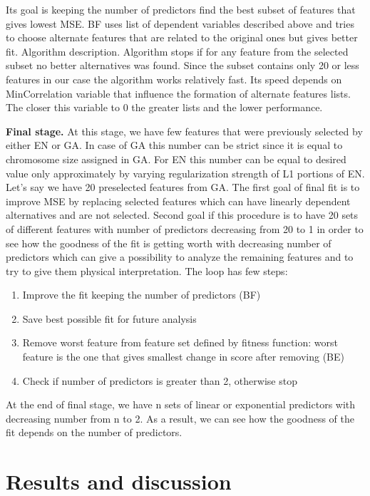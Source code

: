 \documentclass[aps,prl,reprint,amsmath,amssymb,nature]{revtex4-1}
\begin{document}
Its goal is keeping the number of predictors find the best subset of 
features that gives lowest MSE. BF uses list of dependent variables 
described above and tries to choose alternate features that are related 
to the original ones but gives better fit. Algorithm description. 
Algorithm stops if for any feature from the selected subset no better 
alternatives was found. Since the subset contains only 20 or less 
features in our case the algorithm works relatively fast. Its speed 
depends on MinCorrelation variable that influence the formation of 
alternate features lists. The closer this variable to 0 the greater 
lists and the lower performance. 

\textbf{Final stage. }At this stage, we have few features that were 
previously selected by either EN or GA. In case of GA this number can be 
strict since it is equal to chromosome size assigned in GA. For EN this 
number can be equal to desired value only approximately by varying 
regularization strength of L1 portions of EN. Let's say we have 20 
preselected features from GA. The first goal of final fit is to improve 
MSE by replacing selected features which can have linearly dependent 
alternatives and are not selected. Second goal if this procedure is to 
have 20 sets of different features with number of predictors decreasing 
from 20 to 1 in order to see how the goodness of the fit is getting 
worth with decreasing number of predictors which can give a possibility 
to analyze the remaining features and to try to give them physical 
interpretation. The loop has few steps:

\begin{enumerate}
\item Improve the fit keeping the number of predictors (BF)
\item Save best possible fit for future analysis
\item Remove worst feature from feature set defined by fitness function: 
worst feature is the one that gives smallest change in score after 
removing (BE)
\item Check if number of predictors is greater than 2, otherwise stop
\setcounter{numberedCntH}{\theenumi}
\end{enumerate}
At the end of final stage, we have n sets of linear or exponential 
predictors with decreasing number from n to 2. As a result, we can see 
how the goodness of the fit depends on the number of predictors.


\section{Results and discussion}
\end{document}
